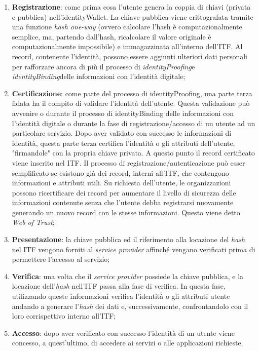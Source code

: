 \begin{enumerate}
	\item \textbf{Registrazione}: come prima cosa l'utente genera la coppia di chiavi (privata e pubblica) nell'\gls{identityWallet}. La chiave pubblica viene crittografata tramite una funzione \textit{hash one-way} (ovvero calcolare l'hash è computazionalmente semplice, ma, partendo dall'hash, ricalcolare il valore originale è computazionalmente impossibile) e immagazzinata all'interno dell'\gls{ITF}. Al record, contenente l'identità, possono essere aggiunti ulteriori dati personali per rafforzare ancora di più il processo di \emph{\gls{identityProofing}}\glsfirstoccur e \emph{\gls{identityBinding}}\glsfirstoccur delle informazioni con l'identità digitale;
	 
	\item \textbf{Certificazione}: come parte del processo di \gls{identityProofing}, una parte terza fidata ha il compito di validare l'identità dell'utente. Questa validazione può avvenire o durante il processo di \gls{identityBinding} delle informazioni con l'identità digitale o durante la fase di registrazione/accesso di un utente ad un particolare servizio. Dopo aver validato con successo le informazioni di identità, questa parte terza certifica l'identità o gli attributi dell'utente, "firmandole" con la propria chiave privata. A questo punto il record certificato viene inserito nel \gls{ITF}.
	Il processo di registrazione/autenticazione può esser semplificato se esistono già dei record, interni all'\gls{ITF}, che contengono informazioni e attributi utili. 
	Su richiesta dell'utente, le organizzazioni possono ricertificare dei record per aumentare il livello di sicurezza delle informazioni contenute senza che l'utente debba registrarsi nuovamente generando un nuovo record con le stesse informazioni. Questo viene detto \textit{Web of Trust};
	 
	\item \textbf{Presentazione}: la chiave pubblica ed il riferimento alla locazione del \textit{hash} nel \gls{ITF} vengono forniti al \textit{service provider} affinché vengano verificati prima di permettere l'accesso al servizio;
	
	\item \textbf{Verifica}: una volta che il \textit{service provider} possiede la chiave pubblica, e la locazione dell'\textit{hash} nell'\gls{ITF} passa alla fase di verifica.
	In questa fase, utilizzando queste informazioni verifica l'identità o gli attributi utente andando a generare l'\textit{hash} dei dati e, successivamente, confrontandolo con il loro corrispettivo interno all'\gls{ITF};
	 
	\item \textbf{Accesso}: dopo aver verificato con successo l'identità di un utente viene concesso, a quest'ultimo, di accedere ai servizi o alle applicazioni richieste.
\end{enumerate}
